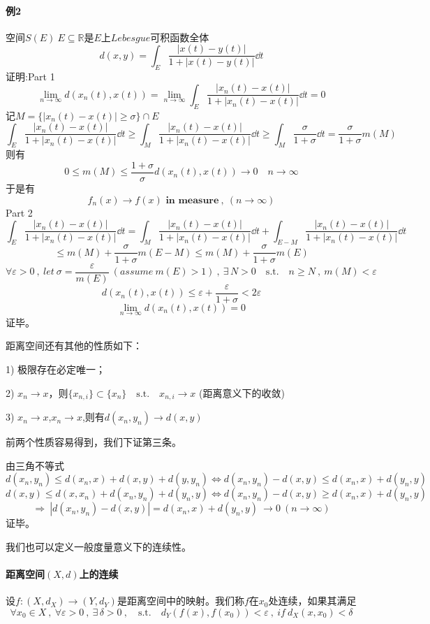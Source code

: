 \paragraph*{例2} \quad 空间$S(E) \ E \subseteq \mathbb{R}$是$E$上$Lebesgue$可积函数全体
\[d(x,y)=\int_E\frac{\left|x(t)-y(t)\right|}{1+\left|x(t)-y(t)\right|}\dd t\]
证明:Part 1
\[\lim_{n \rightarrow \infty}d(x_n(t),x(t))=\lim_{n \rightarrow \infty}\int_E\frac{\left|x_n(t)-x(t)\right|}{1+\left|x_n(t)-x(t)\right|}\dd t=0\]
记$M=\{|x_n(t)-x(t)| \geq \sigma\}\cap E$
\[\int_E\frac{\left|x_n(t)-x(t)\right|}{1+\left|x_n(t)-x(t)\right|}\dd t \geq \int_M\frac{\left|x_n(t)-x(t)\right|}{1+\left|x_n(t)-x(t)\right|}\dd t \geq \int_M\frac{\sigma}{1+\sigma}\dd t=\frac{\sigma}{1+\sigma}m(M)\]
则有
\[0 \leq m(M) \leq \frac{1+\sigma}{\sigma}d(x_n(t),x(t))\rightarrow 0 \quad n \rightarrow \infty\]
于是有
\[f_n(x) \rightarrow f(x)\textbf{ in measure} \ , \ (n \rightarrow \infty)\]
Part 2
\[\int_E\frac{\left|x_n(t)-x(t)\right|}{1+\left|x_n(t)-x(t)\right|}\dd t=\int_M\frac{\left|x_n(t)-x(t)\right|}{1+\left|x_n(t)-x(t)\right|}\dd t+\int_{E-M}\frac{\left|x_n(t)-x(t)\right|}{1+\left|x_n(t)-x(t)\right|}\dd t\]
\[\leq m(M)+\frac{\sigma}{1+\sigma}m(E-M) \leq m(M)+\frac{\sigma}{1+\sigma}m(E)\]
\[\forall \varepsilon>0 \ , \ let \ \sigma=\frac{\varepsilon}{m(E)} \ (assume \ m(E)>1) \ , \ \exists \, N>0 \quad \text{s.t.} \quad n \geq N \ , \ m(M)<\varepsilon\]
\[d(x_n(t),x(t)) \leq \varepsilon+\frac{\varepsilon}{1+\sigma}<2\varepsilon\]
\[\lim_{n \rightarrow \infty}d(x_n(t),x(t))=0\]
证毕。

距离空间还有其他的性质如下：

1) 极限存在必定唯一；

2) $x_n \rightarrow x$，则$\{x_{n,i}\} \subset \{x_n\} \quad \text{s.t.} \quad x_{n,i} \rightarrow x$ (距离意义下的收敛)

3) $x_n \rightarrow x$,$x_n \rightarrow x$,则有$d(x_n,y_n) \rightarrow d(x,y)$

前两个性质容易得到，我们下证第三条。

由三角不等式
\[d(x_n,y_n) \leq d(x_n,x)+d(x,y)+d(y,y_n) \Leftrightarrow d(x_n,y_n)-d(x,y) \leq d(x_n,x)+d(y_n,y)\]
\[d(x,y) \leq d(x,x_n)+d(x_n,y_n)+d(y_n,y) \Leftrightarrow d(x_n,y_n)-d(x,y) \geq d(x_n,x)+d(y_n,y)\]
\[\Rightarrow \ |d(x_n,y_n)-d(x,y)|=d(x_n,x)+d(y_n,y) \ \rightarrow 0 \ (n \rightarrow \infty)\]
证毕。

我们也可以定义一般度量意义下的连续性。
\paragraph*{距离空间$(X,d)$上的连续} \quad 设$f:(X,d_X) \rightarrow (Y,d_Y)$是距离空间中的映射。我们称$f$在$x_0$处连续，如果其满足
\[\forall x_0 \in X \ , \ \forall \varepsilon>0 \ , \ \exists \, \delta>0 \ , \quad \text{s.t.} \quad d_Y(f(x),f(x_0))<\varepsilon \ , \ if \ d_X(x,x_0)<\delta\]

